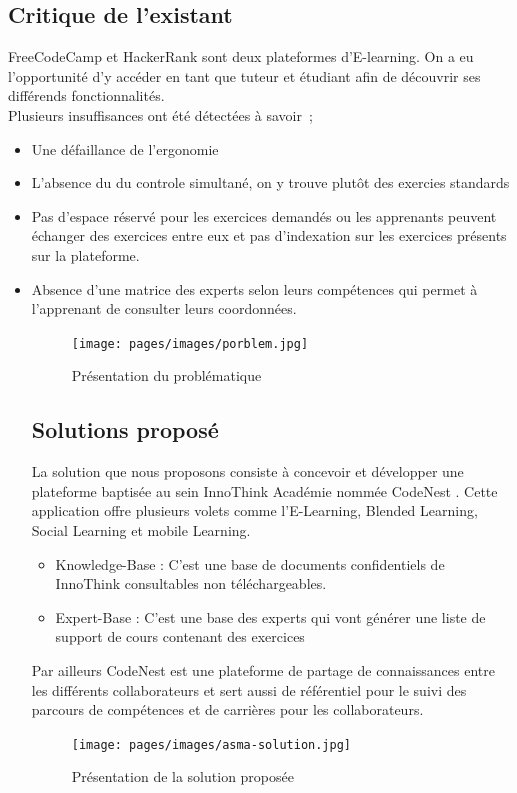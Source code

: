 \subsection{Critique de l'existant}
FreeCodeCamp et HackerRank sont deux plateformes d'E-learning. On a eu
l’opportunité d’y accéder en tant que tuteur et étudiant afin de découvrir ses différends
fonctionnalités.
\\
Plusieurs insuffisances ont été détectées à savoir ;
\begin{itemize}
    
\item  Une défaillance de l’ergonomie
\item L’absence du du controle simultané, on y trouve plutôt des exercies standards 
\item  Pas d’espace réservé pour les exercices demandés ou les apprenants peuvent échanger des exercices entre eux et pas d’indexation sur les exercices présents sur la plateforme.
\item Absence d’une matrice des experts selon leurs compétences qui permet à l’apprenant
de consulter leurs coordonnées.

\begin{figure}[ht]%
    \center%
    \texttt{[image: pages/images/porblem.jpg]}
    \vspace{3mm}
    \caption{Présentation du problématique}\label{fig:test}%
  \end{figure}

\vspace{10mm}
\subsection{Solutions proposé}
La solution que nous proposons consiste à concevoir et développer une plateforme
baptisée au sein InnoThink Académie nommée CodeNest . Cette application offre plusieurs volets comme l’E-Learning, Blended Learning, Social Learning et mobile Learning.
\begin{itemize}
    \item Knowledge-Base : C’est une base de documents confidentiels de InnoThink
consultables non téléchargeables.
\item Expert-Base : C’est une base des experts qui vont générer une liste de support de cours contenant des exercices 
\end{itemize}
Par ailleurs CodeNest  est une plateforme de partage de
connaissances entre les différents collaborateurs et sert aussi de référentiel pour le suivi des
parcours de compétences et de carrières pour les collaborateurs.
\vspace{5mm}
\begin{figure}[ht]%
    \center%
    \texttt{[image: pages/images/asma-solution.jpg]}
    \vspace{3mm}
    \caption{Présentation de la solution proposée}\label{fig:test}%
  \end{figure}


\end{itemize}
